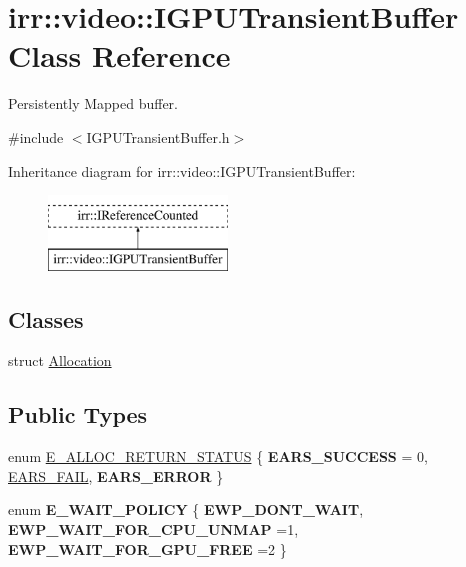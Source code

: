 \hypertarget{classirr_1_1video_1_1IGPUTransientBuffer}{}\section{irr\+:\+:video\+:\+:I\+G\+P\+U\+Transient\+Buffer Class Reference}
\label{classirr_1_1video_1_1IGPUTransientBuffer}


Persistently Mapped buffer.  




{\ttfamily \#include $<$I\+G\+P\+U\+Transient\+Buffer.\+h$>$}

Inheritance diagram for irr\+:\+:video\+:\+:I\+G\+P\+U\+Transient\+Buffer\+:\begin{figure}[H]
\begin{center}
\leavevmode
\includegraphics[height=2.000000cm]{classirr_1_1video_1_1IGPUTransientBuffer}
\end{center}
\end{figure}
\subsection*{Classes}
\begin{DoxyCompactItemize}
\item 
struct \hyperlink{structirr_1_1video_1_1IGPUTransientBuffer_1_1Allocation}{Allocation}
\end{DoxyCompactItemize}
\subsection*{Public Types}
\begin{DoxyCompactItemize}
\item 
enum \hyperlink{classirr_1_1video_1_1IGPUTransientBuffer_a08e145b30588c9a3e5ec469e36f2847b}{E\+\_\+\+A\+L\+L\+O\+C\+\_\+\+R\+E\+T\+U\+R\+N\+\_\+\+S\+T\+A\+T\+US} \{ {\bfseries E\+A\+R\+S\+\_\+\+S\+U\+C\+C\+E\+SS} = 0, 
\hyperlink{classirr_1_1video_1_1IGPUTransientBuffer_a08e145b30588c9a3e5ec469e36f2847bab3c64a0286d714b4590193582b0d0cb6}{E\+A\+R\+S\+\_\+\+F\+A\+IL}, 
{\bfseries E\+A\+R\+S\+\_\+\+E\+R\+R\+OR}
 \}
\item 
enum {\bfseries E\+\_\+\+W\+A\+I\+T\+\_\+\+P\+O\+L\+I\+CY} \{ {\bfseries E\+W\+P\+\_\+\+D\+O\+N\+T\+\_\+\+W\+A\+IT}, 
{\bfseries E\+W\+P\+\_\+\+W\+A\+I\+T\+\_\+\+F\+O\+R\+\_\+\+C\+P\+U\+\_\+\+U\+N\+M\+AP} =1, 
{\bfseries E\+W\+P\+\_\+\+W\+A\+I\+T\+\_\+\+F\+O\+R\+\_\+\+G\+P\+U\+\_\+\+F\+R\+EE} =2
 \}\hypertarget{classirr_1_1video_1_1IGPUTransientBuffer_aa62d526fb6c6a166336fdc691219a542}{}\label{classirr_1_1video_1_1IGPUTransientBuffer_aa62d526fb6c6a166336fdc691219a542}

\end{DoxyCompactItemize}
